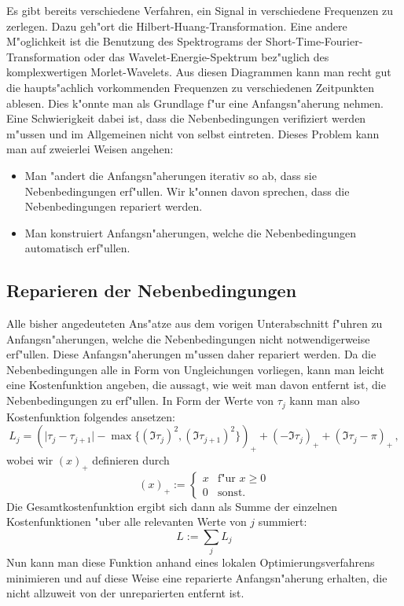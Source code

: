\documentclass[a4paper]{scrartcl}
\begin{document}
Es gibt bereits verschiedene Verfahren, ein Signal in verschiedene Frequenzen zu zerlegen. Dazu geh"ort die Hilbert-Huang-Transformation. Eine andere M"oglichkeit ist die Benutzung des Spektrograms der Short-Time-Fourier-Transformation oder das Wavelet-Energie-Spektrum bez"uglich des komplexwertigen Morlet-Wavelets. Aus diesen Diagrammen kann man recht gut die haupts"achlich vorkommenden Frequenzen zu verschiedenen Zeitpunkten ablesen. Dies k"onnte man als Grundlage f"ur eine Anfangsn"aherung nehmen. Eine Schwierigkeit dabei ist, dass die Nebenbedingungen verifiziert werden m"ussen und im Allgemeinen nicht von selbst eintreten. Dieses Problem kann man auf zweierlei Weisen angehen:
\begin{itemize}
\item Man "andert die Anfangsn"aherungen iterativ so ab, dass sie Nebenbedingungen erf"ullen. Wir k"onnen davon sprechen, dass die Nebenbedingungen repariert werden. 
\item Man konstruiert Anfangsn"aherungen, welche die Nebenbedingungen automatisch erf"ullen. 
\end{itemize}


\subsection{Reparieren der Nebenbedingungen}

Alle bisher angedeuteten Ans"atze aus dem vorigen Unterabschnitt f"uhren zu Anfangsn"aherungen, welche die Nebenbedingungen nicht notwendigerweise erf"ullen. Diese An\-fangs\-n"a\-he\-rungen m"ussen daher repariert werden. Da die Nebenbedingungen alle in Form von Ungleichungen vorliegen, kann man leicht eine Kostenfunktion angeben, die aussagt, wie weit man davon entfernt ist, die Nebenbedingungen zu erf"ullen. In Form der Werte von $\tau_j$ kann man also Kostenfunktion folgendes ansetzen:
$$ L_j = \left(\lvert\tau_j-\tau_{j+1}\rvert - \max\{(\Im\tau_j)^2, (\Im\tau_{j+1})^2\}\right)_+ + (-\Im\tau_j)_+ + (\Im\tau_j-\pi)_+\,, $$
wobei wir $(x)_+$ definieren durch
$$ (x)_+ := \begin{cases} x & \text{f"ur $x\ge0$} \\ 0 & \text{sonst.}\end{cases} $$
Die Gesamtkostenfunktion ergibt sich dann als Summe der einzelnen Kostenfunktionen "uber alle relevanten Werte von $j$ summiert:
$$ L := \sum_j L_j $$
Nun kann man diese Funktion anhand eines lokalen Optimierungsverfahrens minimieren und auf diese Weise eine reparierte Anfangsn"aherung erhalten, die nicht allzuweit von der unreparierten entfernt ist. 
\end{document}

